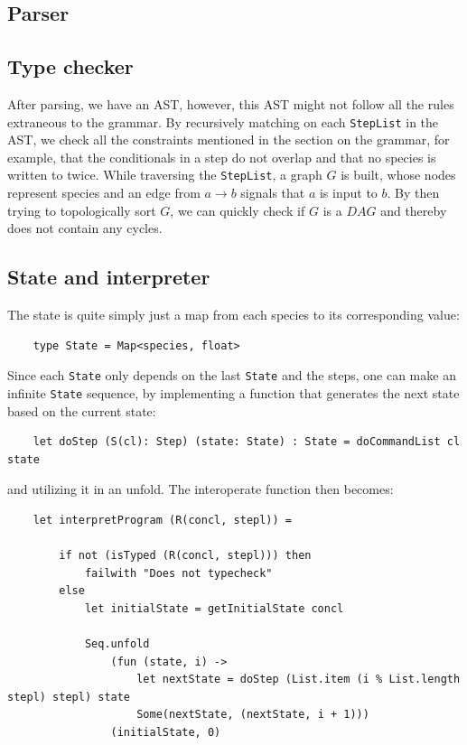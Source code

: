 \subsection{Parser}


\subsection{Type checker}
After parsing, we have an AST, however, this AST might not follow all the rules extraneous to the grammar. By recursively matching on each \texttt{StepList} in the AST, we check all the constraints mentioned in the section on the grammar, for example, that the conditionals in a step do not overlap and that no species is written to twice. While traversing the \texttt{StepList}, a graph $G$ is built, whose nodes represent species and an edge from $a\to b$ signals that $a$ is input to $b$. By then trying to topologically sort $G$, we can quickly check if $G$ is a $DAG$ and thereby does not contain any cycles.

\subsection{State and interpreter}
The state is quite simply just a map from each species to its corresponding value:
\begin{verbatim}
    type State = Map<species, float>
\end{verbatim}
Since each \texttt{State} only depends on the last \texttt{State} and the steps, one can make an infinite \texttt{State} sequence, by implementing a function that generates the next state based on the current state:
\begin{verbatim}
    let doStep (S(cl): Step) (state: State) : State = doCommandList cl state
\end{verbatim}
and utilizing it in an unfold. The interoperate function then becomes:
\begin{verbatim}
    let interpretProgram (R(concl, stepl)) =

        if not (isTyped (R(concl, stepl))) then
            failwith "Does not typecheck"
        else
            let initialState = getInitialState concl
    
            Seq.unfold
                (fun (state, i) ->
                    let nextState = doStep (List.item (i % List.length stepl) stepl) state
                    Some(nextState, (nextState, i + 1)))
                (initialState, 0)
\end{verbatim}

